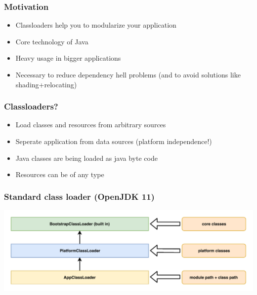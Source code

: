 \documentclass[aspectratio=169]{beamer}
\begin{document}
\begin{frame}
	\frametitle{Motivation}
	\begin{itemize}
		\item{Classloaders help you to modularize your application}
		\item{Core technology of Java}
		\item{Heavy usage in bigger applications}
		\item{Necessary to reduce dependency hell problems (and to avoid solutions like shading+relocating)}
	\end{itemize}
\end{frame}

\begin{frame}
	\frametitle{Classloaders?}
	\begin{itemize}
		\item{Load classes and resources from arbitrary sources}
		\item{Seperate application from data sources (platform independence!)}
		\item{Java classes are being loaded as java byte code}
		\item{Resources can be of any type}
	\end{itemize}
\end{frame}

\begin{frame}
	\frametitle{Standard class loader (OpenJDK 11)}
	\begin{center}
	    \includegraphics[scale=0.7]{assets/AllGraphicsTalk-classloader.pdf}
	\end{center}
\end{frame}
\end{document}
